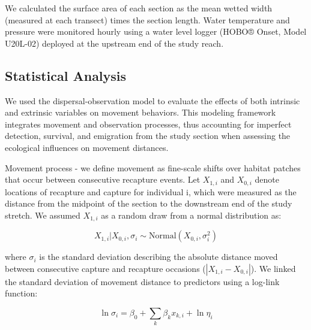 \documentclass[11pt, class=article, crop=false]{standalone}
\begin{document}
We calculated the surface area of each section as the mean wetted width (measured at each transect) times the section length. Water temperature and pressure were monitored hourly using a water level logger (HOBO® Onset, Model U20L-02) deployed at the upstream end of the study reach.

\subsection{Statistical Analysis}

We used the dispersal-observation model to evaluate the effects of both intrinsic and extrinsic variables on movement behaviors. This modeling framework integrates movement and observation processes, thus accounting for imperfect detection, survival, and emigration from the study section when assessing the ecological influences on movement distances.

Movement process - we define movement as fine-scale shifts over habitat patches that occur between consecutive recapture events. Let $X_{1,i}$ and $X_{0,i}$ denote locations of recapture and capture for individual i, which were measured as the distance from the midpoint of the section to the downstream end of the study stretch. We assumed $X_{1,i}$ as a random draw from a normal distribution as:    

\begin{equation}
    X_{1, i}|X_{0, i}, \sigma_i \sim \text{Normal}(X_{0, i}, \sigma_i^2)
    \label{eq:normal}
\end{equation}

where $\sigma_i$ is the standard deviation describing the absolute distance moved between consecutive capture and recapture occasions ($|X_{1,i} - X_{0,i}|$).
We linked the standard deviation of  movement distance to predictors using a log-link function: 

\begin{equation}
    \ln \sigma_i = \beta_0 + \sum_{k} \beta_k x_{k,i} + \ln \eta_i
    \label{eq:linear-pred}
\end{equation}
\end{document}

